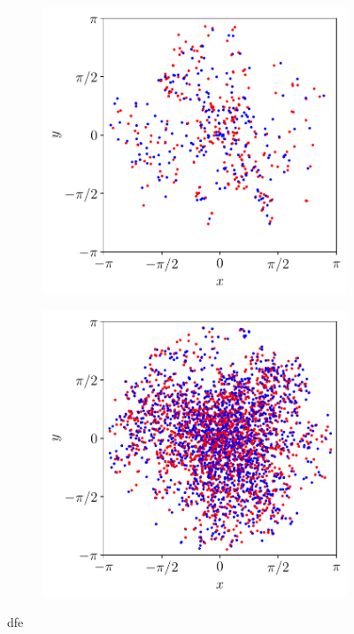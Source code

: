 \documentclass[../main.tex]{subfiles}
\begin{document}
\begin{figure}[ht]
	\centering
	\begin{subfigure}{0.44\textwidth}
		\centering
		\includegraphics[width=\textwidth]{images/pointvortices.R4.00440.pdf}
	\end{subfigure}\hspace{0.04\textwidth}
	\begin{subfigure}{0.44\textwidth}
		\centering
		\includegraphics[width=\textwidth]{images/pointvortices.R32.00550.pdf}
	\end{subfigure}
	\caption{dfe}\label{fig:pointvortices}
\end{figure}
\end{document}
